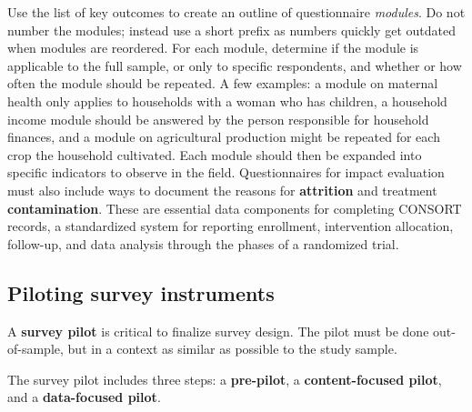 Use the list of key outcomes to create an outline of questionnaire \textit{modules}.
Do not number the modules; instead use a short prefix
as numbers quickly get outdated when modules are reordered.
For each module, determine if the module is applicable to the full sample,
or only to specific respondents,
and whether or how often the module should be repeated.
A few examples:
a module on maternal health only applies
to households with a woman who has children,
a household income module should be answered
by the person responsible for household finances,
and a module on agricultural production
might be repeated for each crop the household cultivated.
Each module should then be expanded
into specific indicators to observe in the field.
Questionnaires for impact evaluation
must also include ways to document the reasons for \textbf{attrition} and
treatment \textbf{contamination}.
These are essential data components for completing CONSORT records,
a standardized system for reporting enrollment, intervention allocation, follow-up,
and data analysis through the phases of a randomized trial.

\subsection{Piloting survey instruments}
A \textbf{survey pilot}
is critical to finalize survey design.
The pilot must be done out-of-sample,
but in a context as similar as possible to the study sample.

The survey pilot includes three steps:
a \textbf{pre-pilot}, a \textbf{content-focused pilot}, and a \textbf{data-focused pilot}.

